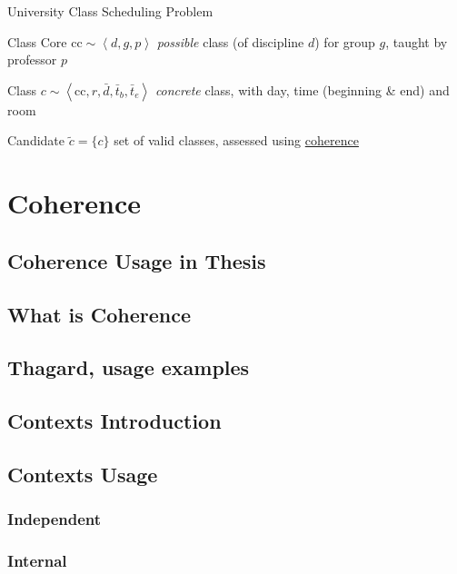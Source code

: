 \documentclass{beamer}
\providecommand{\rootdir}{../doc}
\newcommand{\resizeinput}[2][1]{%
  \resizebox{#1\textwidth}{!}{}%
}
\begin{document}
\begin{frame}{University Class Scheduling Problem}
  \begin{block}{Class Core $\mathrm{cc} \sim \left< d, g, p \right>$}
    \emph{possible} class (of discipline $d$) for group $g$,
    taught by professor $p$
  \end{block}
  \begin{block}{Class $ c \sim \left< \mathrm{cc}, r, \bar d, \bar t_b, \bar t_e \right> $}
    \emph{concrete} class, with day, time (beginning \& end) and room
  \end{block}
  \begin{block}{Candidate $\tilde{c}=\{c\}$}
    set of \alert{valid} classes, assessed using \underline{coherence}
  \end{block}
\end{frame}

\frame{
  \trimbox{30pt 0 0 0}{
    \resizeinput{\rootdir/img/ConnectionMatrix/Candidates-content.tikz}
  }
}

\section{Coherence}
\subsection{Coherence Usage in Thesis}
\subsection{What is Coherence}
\subsection{Thagard, usage examples}
\subsection{Contexts Introduction}
\subsection{Contexts Usage}
\subsubsection{Independent}
\subsubsection{Internal}
\end{document}
